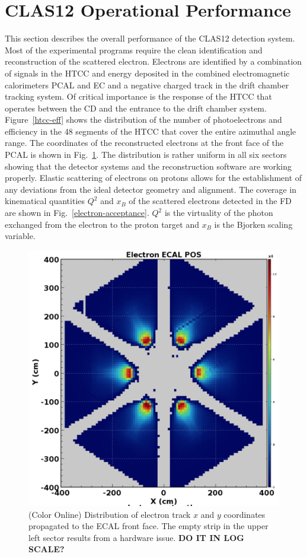 \documentclass[final,3p,twocolumn]{elsarticle}
\begin{document}
\section{CLAS12 Operational Performance}

This section describes the overall performance of the CLAS12 detection system. Most of the experimental programs
require the clean identification and reconstruction of the scattered electron. Electrons are identified by a combination
of signals in the HTCC and energy deposited in the combined electromagnetic calorimeters PCAL and EC and a negative
charged track in the drift chamber tracking system. Of critical importance is the response of the HTCC that operates
between the CD and the entrance to the drift chamber system. Figure~\ref{htcc-eff} shows the distribution of the
number of photoelectrons and efficiency in the 48 segments of the HTCC that cover the entire azimuthal angle range. 
The coordinates of the reconstructed electrons at the front face of the PCAL is shown in Fig.~\ref{electrons-xy}. The
distribution is rather uniform in all six sectors showing that the detector systems and the reconstruction software are
working properly. Elastic scattering  of electrons on protons allows for the establishment of any deviations from the ideal
detector geometry and alignment. The coverage in kinematical quantities $Q^2$ and $x_B$ of the scattered electrons
detected in the FD are shown in Fig.~\ref{electron-acceptance}. $Q^2$ is the virtuality of the photon exchanged from
the electron to the proton target and $x_B$ is the Bjorken scaling variable.

\begin{figure}[htbp!]
\centerline{\includegraphics[width=1.0\columnwidth]{ElectronsOnPCAL.png}}
\caption{(Color Online) Distribution of electron track $x$ and $y$ coordinates propagated to the ECAL front face. The empty strip 
in the upper left sector results from a hardware issue. {\bf DO IT IN LOG SCALE?}} 
\label{electrons-xy}
\end{figure}
\end{document}
